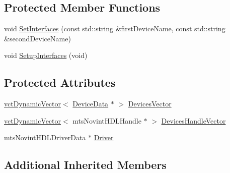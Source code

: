 \subsection*{Protected Member Functions}
\begin{DoxyCompactItemize}
\item 
void \hyperlink{classmts_novint_h_d_l_ac1a5cba2d5b5b9f14de1333e740fb493}{Set\+Interfaces} (const std\+::string \&first\+Device\+Name, const std\+::string \&second\+Device\+Name)
\item 
void \hyperlink{classmts_novint_h_d_l_a610204e77405d6c1e116359390aaacff}{Setup\+Interfaces} (void)
\end{DoxyCompactItemize}
\subsection*{Protected Attributes}
\begin{DoxyCompactItemize}
\item 
\hyperlink{classvct_dynamic_vector}{vct\+Dynamic\+Vector}$<$ \hyperlink{structmts_novint_h_d_l_1_1_device_data}{Device\+Data} $\ast$ $>$ \hyperlink{classmts_novint_h_d_l_a7f19ef6b35fd78933bb09d8adeedf986}{Devices\+Vector}
\item 
\hyperlink{classvct_dynamic_vector}{vct\+Dynamic\+Vector}$<$ mts\+Novint\+H\+D\+L\+Handle $\ast$ $>$ \hyperlink{classmts_novint_h_d_l_a63c863bb97b427554c3647a1bfc5cbca}{Devices\+Handle\+Vector}
\item 
mts\+Novint\+H\+D\+L\+Driver\+Data $\ast$ \hyperlink{classmts_novint_h_d_l_a8eeac12be5c50e55c932e88fea791632}{Driver}
\end{DoxyCompactItemize}
\subsection*{Additional Inherited Members}


